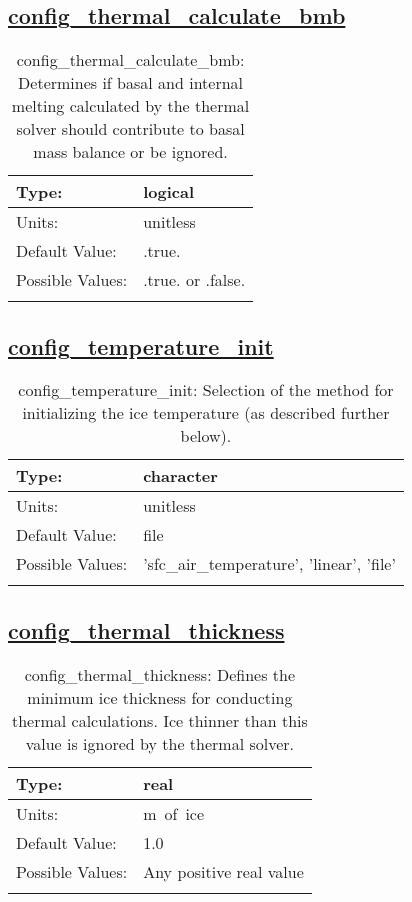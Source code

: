 \subsection[config\_thermal\_calculate\_bmb]{\hyperref[sec:nm_tab_thermal_solver]{config\_thermal\_calculate\_bmb}}
\label{subsec:nm_sec_config_thermal_calculate_bmb}
\begin{center}
\begin{longtable}{| p{2.0in} || p{4.0in} |}
    \hline
    Type: & logical \\
    \hline
    Units: & \si{unitless} \\
    \hline
    Default Value: & .true. \\
    \hline
    Possible Values: & .true. or .false. \\
    \hline
    \caption{config\_thermal\_calculate\_bmb: Determines if basal and internal melting calculated by the thermal solver should contribute to basal mass balance or be ignored.}
\end{longtable}
\end{center}
\subsection[config\_temperature\_init]{\hyperref[sec:nm_tab_thermal_solver]{config\_temperature\_init}}
\label{subsec:nm_sec_config_temperature_init}
\begin{center}
\begin{longtable}{| p{2.0in} || p{4.0in} |}
    \hline
    Type: & character \\
    \hline
    Units: & \si{unitless} \\
    \hline
    Default Value: & file \\
    \hline
    Possible Values: & 'sfc\_air\_temperature', 'linear', 'file' \\
    \hline
    \caption{config\_temperature\_init: Selection of the method for initializing the ice temperature (as described further below).}
\end{longtable}
\end{center}
\subsection[config\_thermal\_thickness]{\hyperref[sec:nm_tab_thermal_solver]{config\_thermal\_thickness}}
\label{subsec:nm_sec_config_thermal_thickness}
\begin{center}
\begin{longtable}{| p{2.0in} || p{4.0in} |}
    \hline
    Type: & real \\
    \hline
    Units: & \si{m.of.ice} \\
    \hline
    Default Value: & 1.0 \\
    \hline
    Possible Values: & Any positive real value \\
    \hline
    \caption{config\_thermal\_thickness: Defines the minimum ice thickness for conducting thermal calculations. Ice thinner than this value is ignored by the thermal solver.}
\end{longtable}
\end{center}
